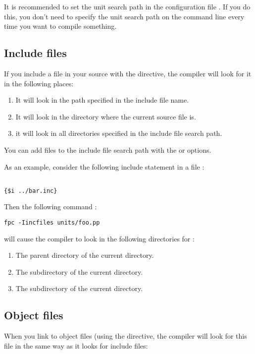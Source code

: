 It is recommended to set the unit search path in the configuration file
. If you do this, you don't need to specify the unit search
path on the command line every time you want to compile something.

\subsection{Include files}
If you include a file in your source with the 
directive, the compiler will look for it in the following places:

\begin{enumerate}
\item It will look in the path specified in the include file name.
\item It will look in the directory where the current source file is.
\item it will look in all directories specified in the include file search
path.
\end{enumerate}
You can add files to the include file search path with the  or
 options.

As an example, consider the following include statement in a file
:
\begin{verbatim}

{$i ../bar.inc}

\end{verbatim}
Then the following command :
\begin{verbatim}
fpc -Iincfiles units/foo.pp
\end{verbatim}
will cause the compiler to look in the following directories for
:
\begin{enumerate}
\item The parent directory of the current directory.
\item The  subdirectory of the current directory.
\item The  subdirectory of the current directory.
\end{enumerate}

\subsection{Object files}
When you link to object files (using the  directive,
the compiler will look for this file in the same way as it looks for include
files:

